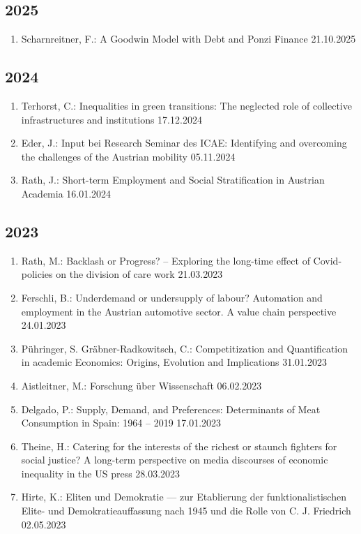 \subsection*{2025}
\begin{enumerate}
	\item Scharnreitner, F.: A Goodwin Model with Debt and Ponzi Finance 21.10.2025
\end{enumerate}
\subsection*{2024}
\begin{enumerate}
	\item Terhorst, C.: Inequalities in green transitions: The neglected role of collective infrastructures and institutions 17.12.2024
	\item Eder, J.: Input bei Research Seminar des ICAE: Identifying and overcoming the challenges of the Austrian mobility 05.11.2024
	\item Rath, J.: Short-term Employment and Social Stratification in Austrian Academia 16.01.2024
\end{enumerate}
\subsection*{2023}
\begin{enumerate}
	\item  Rath, M.: Backlash or Progress? -- Exploring the long-time effect of Covid-policies on the division of care work 21.03.2023
	\item Ferschli, B.: Underdemand or undersupply of labour? Automation and employment in the Austrian automotive sector. A value chain perspective 24.01.2023
	\item Pühringer, S. Gräbner-Radkowitsch, C.: Competitization and Quantification in academic Economics: Origins, Evolution and Implications 31.01.2023
	\item Aistleitner, M.: Forschung über Wissenschaft 06.02.2023
	\item  Delgado, P.: Supply, Demand, and Preferences: Determinants of Meat Consumption in Spain: 1964 – 2019 17.01.2023
	\item Theine, H.: Catering for the interests of the richest or staunch fighters for social justice? A long-term perspective on media discourses of economic inequality in the US press 28.03.2023
	\item Hirte, K.: Eliten und Demokratie — zur Etablierung der funktionalistischen Elite- und Demokratieauffassung nach 1945 und die Rolle von C. J. Friedrich 02.05.2023
\end{enumerate}
